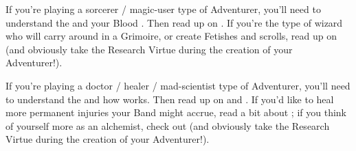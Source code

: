 \begin{multicols*}{2}

    If you're playing a sorcerer / magic-user type of Adventurer, you'll need to understand the  and your Blood \POOL. Then read up on . If you're the type of wizard who will carry  around in a Grimoire, or create Fetishes and scrolls, read up on  (and obviously take the Research Virtue during the creation of your Adventurer!).

\cbreak


    If you're playing a doctor / healer / mad-scientist type of Adventurer, you'll need to understand the  and how  works. Then read up on  and . If you'd like to heal more permanent injuries your Band might accrue, read a bit about ; if you think of yourself more as an alchemist, check out  (and obviously take the Research Virtue during the creation of your Adventurer!).


\end{multicols*}


